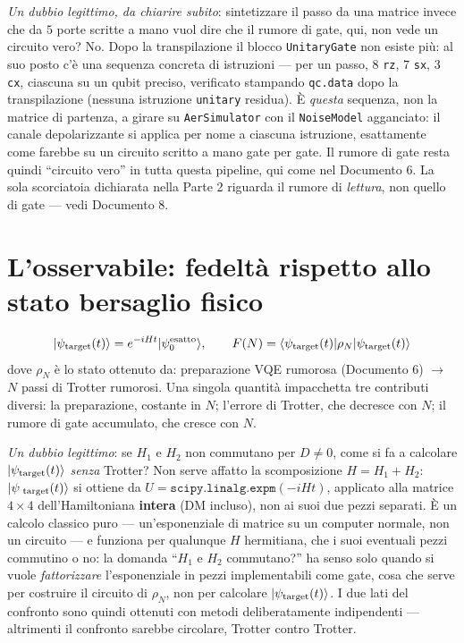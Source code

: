\documentclass[11pt,a4paper]{article}
\begin{document}
\noindent\textit{Un dubbio legittimo, da chiarire subito}: sintetizzare il
passo da una matrice invece che da $5$ porte scritte a mano vuol dire che il
rumore di gate, qui, non vede un circuito vero? No. Dopo la transpilazione il
blocco \texttt{UnitaryGate} non esiste più: al suo posto c'è una sequenza
concreta di istruzioni --- per un passo, $8$ \texttt{rz}, $7$ \texttt{sx},
$3$ \texttt{cx}, ciascuna su un qubit preciso, verificato stampando
\texttt{qc.data} dopo la transpilazione (nessuna istruzione
\texttt{unitary} residua). È \emph{questa} sequenza, non la matrice di
partenza, a girare su \texttt{AerSimulator} con il \texttt{NoiseModel}
agganciato: il canale depolarizzante si applica per nome a ciascuna
istruzione, esattamente come farebbe su un circuito scritto a mano gate per
gate. Il rumore di gate resta quindi ``circuito vero'' in tutta questa
pipeline, qui come nel Documento 6. La sola scorciatoia dichiarata nella
Parte 2 riguarda il rumore di \emph{lettura}, non quello di gate --- vedi
Documento 8.

\section{L'osservabile: fedeltà rispetto allo stato bersaglio fisico}

\begin{equation}
\lvert \psi_\text{target}(t)\rangle = e^{-iHt}\lvert \psi_0^\text{esatto}\rangle, \qquad
F(N) = \langle \psi_\text{target}(t) \rvert\rho_N\lvert \psi_\text{target}(t)\rangle
\end{equation}
dove $\rho_N$ è lo stato ottenuto da: preparazione VQE rumorosa (Documento 6)
$\to$ $N$ passi di Trotter rumorosi. Una singola quantità impacchetta tre
contributi diversi: la preparazione, costante in $N$; l'errore di Trotter, che
decresce con $N$; il rumore di gate accumulato, che cresce con $N$.

\noindent\textit{Un dubbio legittimo}: se $H_1$ e $H_2$ non commutano per
$D\neq0$, come si fa a calcolare $\ket{\psi_\text{target}(t)}$ \emph{senza}
Trotter? Non serve affatto la scomposizione $H=H_1+H_2$: $\ket{\psi_\text{
target}(t)}$ si ottiene da $U=\texttt{scipy.linalg.expm}(-iHt)$, applicato
alla matrice $4\times4$ dell'Hamiltoniana \textbf{intera} (DM incluso), non
ai suoi due pezzi separati. È un calcolo classico puro --- un'esponenziale
di matrice su un computer normale, non un circuito --- e funziona per
qualunque $H$ hermitiana, che i suoi eventuali pezzi commutino o no: la
domanda ``$H_1$ e $H_2$ commutano?'' ha senso solo quando si vuole
\emph{fattorizzare} l'esponenziale in pezzi implementabili come gate,
cosa che serve per costruire il circuito di $\rho_N$, non per calcolare
$\ket{\psi_\text{target}(t)}$. I due lati del confronto sono quindi ottenuti
con metodi deliberatamente indipendenti --- altrimenti il confronto
sarebbe circolare, Trotter contro Trotter.
\end{document}
